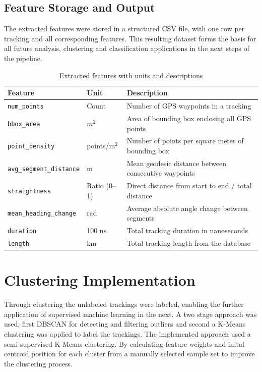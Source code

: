 \documentclass[a4paper,12pt,twoside]{scrreprt}
\begin{document}
\subsection{Feature Storage and Output}

The extracted features were stored in a structured CSV file, with one row per
tracking and all corresponding features. This resulting dataset forms the
basis for all future analysis, clustering and classification applications in
the next steps of the pipeline.

\begin{table}[ht]
  \centering
  \begin{tabular}{|l|l|l|}
    \hline
    \textbf{Feature}                & \textbf{Unit} & \textbf{Description}
    \\
    \hline
    \texttt{num\_points}            & Count         & Number of GPS waypoints
    in a tracking
    \\
    \hline
    \texttt{bbox\_area}             & $m^2$         & Area of bounding box
    enclosing all GPS points
    \\
    \hline
    \texttt{point\_density}         & points/m$^2$  & Number of points per
    square meter
    of bounding box
    \\
    \hline
    \texttt{avg\_segment\_distance} & m             & Mean geodesic distance
    between
    consecutive waypoints
    \\
    \hline
    \texttt{straightness}           & Ratio (0–1)   & Direct distance from
    start to end /
    total distance
    \\
    \hline
    \texttt{mean\_heading\_change}  & rad           & Average absolute angle
    change
    between segments
    \\
    \hline
    \texttt{duration}               & 100 ns        & Total tracking
    duration in nanoseconds
    \\
    \hline
    \texttt{length}                 & km            & Total tracking length
    from the database
    \\
    \hline
  \end{tabular}
  \caption{Extracted features with units and descriptions}
  \label{tab:feature_units}
\end{table}

\section{Clustering Implementation}
Through clustering the unlabeled trackings were labeled, enabling the further
application of supervised machine learning in the next.
A two stage approach was used, first DBSCAN for detecting and filtering
outliers and second a K-Means clustering was applied to label the trackings.
The implemented approach used a semi-supervised K-Means clustering. By
calculating feature weights and inital centroid position for each cluster from
a manually selected sample set to improve the clustering process.
\end{document}
